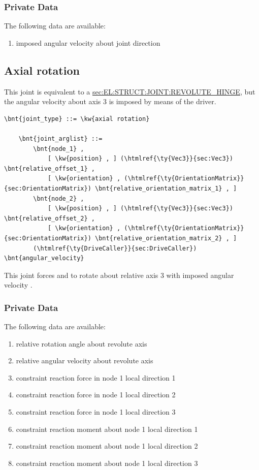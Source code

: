 \subsubsection{Private Data}
The following data are available:
\begin{enumerate}
\item {} imposed angular velocity about joint direction
\end{enumerate}



\subsection{Axial rotation}
\label{sec:EL:STRUCT:JOINT:AXIAL_ROTATION}
This joint is equivalent to a
\hyperref{\kw{revolute hinge}}{\kw{revolute hinge} (see Section~}{)}{sec:EL:STRUCT:JOINT:REVOLUTE_HINGE},
but the angular velocity about axis 3 is imposed by means of the driver.
\begin{Verbatim}[commandchars=\\\{\}]
    \bnt{joint_type} ::= \kw{axial rotation}

    \bnt{joint_arglist} ::= 
        \bnt{node_1} ,
            [ \kw{position} , ] (\htmlref{\ty{Vec3}}{sec:Vec3}) \bnt{relative_offset_1} ,
            [ \kw{orientation} , (\htmlref{\ty{OrientationMatrix}}{sec:OrientationMatrix}) \bnt{relative_orientation_matrix_1} , ]
        \bnt{node_2} ,
            [ \kw{position} , ] (\htmlref{\ty{Vec3}}{sec:Vec3}) \bnt{relative_offset_2} ,
            [ \kw{orientation} , (\htmlref{\ty{OrientationMatrix}}{sec:OrientationMatrix}) \bnt{relative_orientation_matrix_2} , ]
        (\htmlref{\ty{DriveCaller}}{sec:DriveCaller}) \bnt{angular_velocity}
\end{Verbatim}
This joint forces  and  to rotate about relative 
axis 3 with imposed angular velocity .

\subsubsection{Private Data}
The following data are available:
\begin{enumerate}
\item {} relative rotation angle about revolute axis
\item {} relative angular velocity about revolute axis
\item {} constraint reaction force in node 1 local direction 1
\item {} constraint reaction force in node 1 local direction 2
\item {} constraint reaction force in node 1 local direction 3
\item {} constraint reaction moment about node 1 local direction 1
\item {} constraint reaction moment about node 1 local direction 2
\item {} constraint reaction moment about node 1 local direction 3
\end{enumerate}

